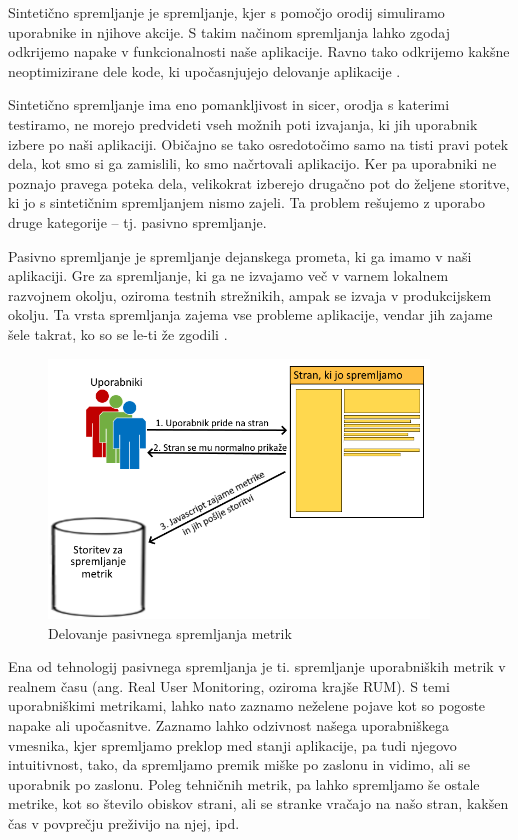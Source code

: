 \documentclass[a4paper, 12pt]{book}
\begin{document}
Sintetično spremljanje je spremljanje, kjer s pomočjo orodij simuliramo uporabnike in njihove akcije. S takim načinom spremljanja lahko zgodaj odkrijemo napake v funkcionalnosti naše aplikacije. Ravno tako odkrijemo kakšne neoptimizirane dele kode, ki upočasnjujejo delovanje aplikacije \cite{what_is_rum}.

Sintetično spremljanje ima eno pomankljivost in sicer, orodja s katerimi testiramo, ne morejo predvideti vseh možnih poti izvajanja, ki jih uporabnik izbere po naši aplikaciji. Običajno se tako osredotočimo samo na tisti pravi potek dela, kot smo si ga zamislili, ko smo načrtovali aplikacijo. Ker pa uporabniki ne poznajo pravega poteka dela, velikokrat izberejo drugačno pot do željene storitve, ki jo s sintetičnim spremljanjem nismo zajeli. Ta problem rešujemo z uporabo druge kategorije – tj.  pasivno spremljanje.

Pasivno spremljanje je spremljanje dejanskega prometa, ki ga imamo v naši aplikaciji. Gre za spremljanje, ki ga ne izvajamo več v varnem lokalnem razvojnem okolju, oziroma testnih strežnikih, ampak se izvaja v produkcijskem okolju. Ta vrsta spremljanja zajema vse probleme aplikacije, vendar jih zajame šele takrat, ko so se le-ti že zgodili \cite{rum_o_reilly}.

\begin{figure}[h]
	\begin{center}
		\includegraphics[width=0.9\textwidth]{rum_diagram.png}
	\end{center}
	\caption{Delovanje pasivnega spremljanja metrik}
	\label{img:rum}
\end{figure}

Ena od tehnologij pasivnega spremljanja je ti. spremljanje uporabniških metrik v realnem času (ang. Real User Monitoring, oziroma krajše RUM). S temi uporabniškimi metrikami, lahko nato zaznamo neželene pojave kot so pogoste napake ali upočasnitve. Zaznamo lahko odzivnost našega uporabniškega vmesnika, kjer spremljamo preklop med stanji aplikacije, pa tudi njegovo intuitivnost, tako, da spremljamo premik miške po zaslonu in vidimo, ali se uporabnik  po zaslonu. Poleg tehničnih metrik, pa lahko spremljamo še ostale metrike, kot so število obiskov strani, ali se stranke vračajo na našo stran, kakšen čas v povprečju preživijo na njej, ipd.
\end{document}
